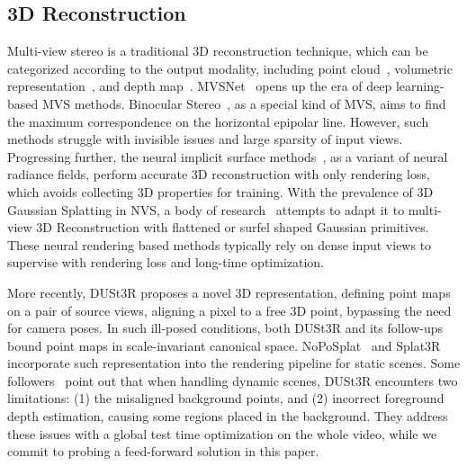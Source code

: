 \subsection{3D Reconstruction}

Multi-view stereo is a traditional 3D reconstruction technique, which can be categorized according to the output modality, including point cloud~\cite{lhuillier2005quasi, furukawa2009accurate}, volumetric representation~\cite{seitz1999photorealistic, kutulakos2000theory}, and depth map~\cite{campbell2008using, schonberger2016pixelwise}.
%
MVSNet~\cite{yao2018mvsnet} opens up the era of deep learning-based MVS methods.
%
Binocular Stereo~\cite{zabih1994non}, as a special kind of MVS, aims to find the maximum correspondence on the horizontal epipolar line.
However, such methods struggle with invisible issues and large sparsity of input views.
%
Progressing further, the neural implicit surface methods~\cite{wang2021neus, wang2023neus2, li2023neuralangelo}, as a variant of neural radiance fields, perform accurate 3D reconstruction with only rendering loss, which avoids collecting 3D properties for training.
%
With the prevalence of 3D Gaussian Splatting in NVS, a body of research~\cite{huang20242d, dai2024high, guedon2024sugar, lyu20243dgsr} attempts to adapt it to multi-view 3D Reconstruction with flattened or surfel shaped Gaussian primitives.
%
These neural rendering based methods typically rely on dense input views to supervise with rendering loss and long-time optimization.


More recently, DUSt3R\cite{wang2024dust3r} proposes a novel 3D representation, defining point maps on a pair of source views, aligning a pixel to a free 3D point, bypassing the need for camera poses.
%
In such ill-posed conditions, both DUSt3R and its follow-ups~\cite{leroy2024grounding, wang2024moge} bound point maps in scale-invariant canonical space.
%
NoPoSplat~\cite{ye2024nopose} and Splat3R~\cite{smart2024splatt3r} incorporate such representation into the rendering pipeline for static scenes.
%
Some followers~\cite{lu2024align3r, zhang2024monst3r} point out that when handling dynamic scenes, DUSt3R encounters two limitations: (1) the misaligned background points, and (2) incorrect foreground depth estimation, causing some regions placed in the background.
%
They address these issues with a global test time optimization on the whole video, while we commit to probing a feed-forward solution in this paper.
